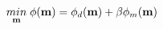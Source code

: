 \vspace{-0.1cm}
\begin{equation}
    \underset{\mathbf{m}}{min} \; \phi(\mathbf{m}) = \phi_{d}(\mathbf{m}) + \beta\phi_{m}(\mathbf{m})
    \label{eq:forward-pass}
    \vspace{-0.05cm}
\end{equation}